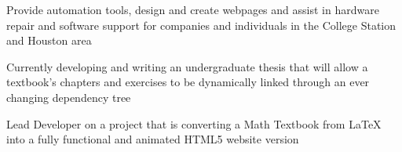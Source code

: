 \documentclass[letterpaper]{deedy-resume} %
\begin{document}
\begin{minipage}[t]{0.66\textwidth}
\sectionspace %



\begin{tightitemize}
\item Provide automation tools, design and create webpages and assist in hardware repair and software support for companies and individuals in the College Station and Houston area
\end{tightitemize}

\sectionspace %



\begin{tightitemize}
\item Currently developing and writing an undergraduate thesis that
will allow a textbook's chapters and exercises to be dynamically
linked through an ever changing dependency tree

\item Lead Developer on a project that is converting a Math Textbook from \LaTeX \hspace*{0.3mm} into a fully functional and animated HTML5 website version
\end{tightitemize}

\sectionspace %





\end{minipage}
\end{document}
